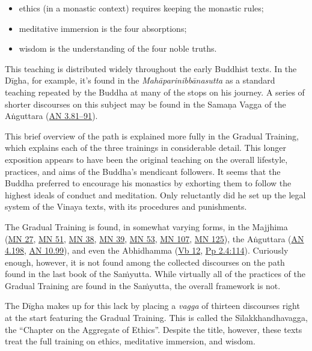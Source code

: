 \documentclass[12pt,openany]{book}%
\begin{document}
\begin{itemize}%
\item ethics (in a monastic context) requires keeping the monastic rules;%
\item meditative immersion is the four absorptions;%
\item wisdom is the understanding of the four noble truths.%
\end{itemize}

This teaching is distributed widely throughout the early Buddhist texts. In the \textsanskrit{Dīgha}, for example, it’s found in the \textit{\textsanskrit{Mahāparinibbānasutta}} as a standard teaching repeated by the Buddha at many of the stops on his journey. A series of shorter discourses on this subject may be found in the \textsanskrit{Samaṇa} Vagga of the \textsanskrit{Aṅguttara} (\href{https://suttacentral.net/an3-samanavagga}{AN 3.81–91}).

This brief overview of the path is explained more fully in the Gradual Training, which explains each of the three trainings in considerable detail. This longer exposition appears to have been the original teaching on the overall lifestyle, practices, and aims of the Buddha’s mendicant followers. It seems that the Buddha preferred to encourage his monastics by exhorting them to follow the highest ideals of conduct and meditation. Only reluctantly did he set up the legal system of the Vinaya texts, with its procedures and punishments.

The Gradual Training is found, in somewhat varying forms, in the Majjhima (\href{https://suttacentral.net/mn27}{MN 27}, \href{https://suttacentral.net/mn51}{MN 51}, \href{https://suttacentral.net/mn38}{MN 38}, \href{https://suttacentral.net/mn39}{MN 39}, \href{https://suttacentral.net/mn53}{MN 53}, \href{https://suttacentral.net/mn107}{MN 107}, \href{https://suttacentral.net/mn125}{MN 125}), the \textsanskrit{Aṅguttara} (\href{https://suttacentral.net/an4.198}{AN 4.198}, \href{https://suttacentral.net/an10.99}{AN 10.99}), and even the Abhidhamma (\href{https://suttacentral.net/vb12}{Vb 12}, \href{https://suttacentral.net/pp2.4\#114}{Pp 2.4:114}). Curiously enough, however, it is not found among the collected discourses on the path found in the last book of the \textsanskrit{Saṁyutta}. While virtually all of the practices of the Gradual Training are found in the \textsanskrit{Saṁyutta}, the overall framework is not.

The \textsanskrit{Dīgha} makes up for this lack by placing a \textit{vagga} of thirteen discourses right at the start featuring the Gradual Training. This is called the \textsanskrit{Sīlakkhandhavagga}, the “Chapter on the Aggregate of Ethics”. Despite the title, however, these texts treat the full training on ethics, meditative immersion, and wisdom.
\end{document}
